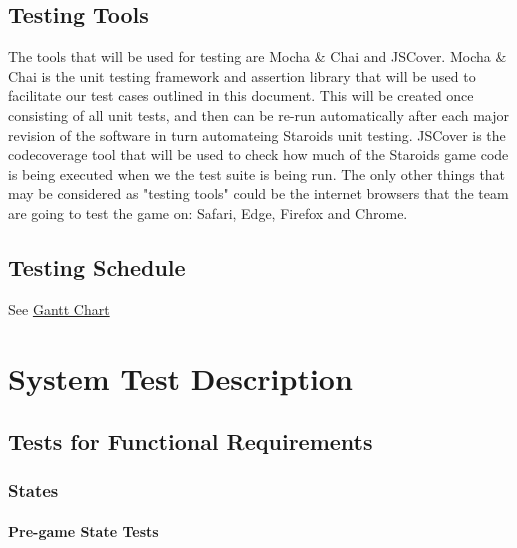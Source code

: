 \documentclass[12pt, titlepage]{article}
\begin{document}
\subsection{Testing Tools}
The tools that will be used for testing are Mocha \& Chai and JSCover. Mocha \& Chai is the unit testing framework and assertion library that will be used to facilitate our test cases outlined in this document. This will be created once consisting of all unit tests, and then can be re-run automatically after each major revision of the software in turn automateing Staroids unit testing. JSCover is the codecoverage tool that will be used to check how much of the Staroids game code is being executed when we the test suite is being run. The only other things that may be considered as "testing tools" could be the internet browsers that the team are going to test the game on: Safari, Edge, Firefox and Chrome.

\subsection{Testing Schedule}

See \href{https://gitlab.cas.mcmaster.ca/nagyj2/Staroids/tree/master/ProjectSchedule/StaroidsGantt.pdf}{Gantt Chart}

\section{System Test Description}

\subsection{Tests for Functional Requirements}

\subsubsection{States}

\paragraph{Pre-game State Tests}
\end{document}
